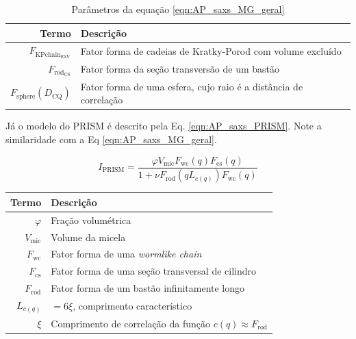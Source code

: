 \begin{apendicesenv}
\begin{table}
    \IBGEtab%
    {\caption{Parâmetros da equação \ref{eqn:AP_saxs_MG_geral}}
     \label{tab_ap:fatores_geral} }%
    {\begin{tabular}{r p{8cm}}
    \toprule
    Termo 			& Descrição        						\\
    \midrule
    \(F_{\mathrm{KPchain}_{\mathrm{ExV}}}\)  & Fator forma de cadeias de Kratky-Porod com volume excluído \\
    \(F_{\mathrm{rod}_{\mathrm{CS}}}\)		 & Fator forma da seção transversão de um bastão	\\
    \(F_{\mathrm{sphere}}(D_{\mathrm{CQ}})\) & Fator forma de uma esfera, cujo raio é a distância de correlação \\
    \bottomrule%
    \end{tabular}}
    {}%
\end{table}


Já o modelo do PRISM é descrito pela Eq. \ref{eqn:AP_saxs_PRISM}. Note a similaridade com a Eq \ref{eqn:AP_saxs_MG_geral}.

\begin{equation}
I_{\mathrm{PRISM}}= \frac{\varphi V_{\mathrm{mic}}F_{\mathrm{wc}}(q)F_{\mathrm{cs}}(q)}{1 + \nu F_{\mathrm{rod}}(qL_{c(q)})F_{\mathrm{wc}}(q)}
\label{eqn:AP_saxs_PRISM}
\end{equation}

\begin{table}
    {%
     \begin{tabular}{r p{8cm}}
     \toprule
     Termo 			& Descrição        						\\
     \midrule
     \(\varphi\)		& Fração volumétrica \\ %
     \(V_{\mathrm{mic}}\)		& Volume da micela   \\
     \(F_{\mathrm{wc}}\)		& Fator forma de uma \emph{wormlike chain} \\
     \(F_{\mathrm{cs}}\)		& Fator forma de uma seção transversal de cilindro \\ %
     \(F_{\mathrm{rod}}\)		& Fator forma de um bastão infinitamente longo \\
     \(L_{c(q)}\)		& \(=6\xi\), comprimento característico \\
     \(\xi\)			& Comprimento de correlação da função \(c(q) \approx F_{\mathrm{rod}}\) \\
     \bottomrule
     \end{tabular}}%
     {}%
\end{table}



\end{apendicesenv}
